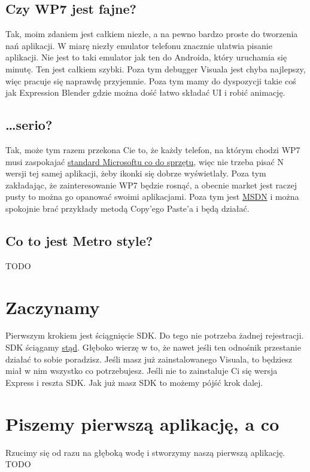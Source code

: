 \documentclass[12pt, a4paper]{article}
\begin{document}
\subsection{Czy WP7 jest fajne?}
Tak, moim zdaniem jest całkiem niezłe, a na pewno bardzo proste do tworzenia nań
aplikacji. W miarę niezły emulator telefonu znacznie ułatwia pisanie aplikacji.
Nie jest to taki emulator jak ten do Androida, który uruchamia się minutę. Ten
jest całkiem szybki. Poza tym debugger Visuala jest chyba najlepszy, więc
pracuje się naprawdę przyjemnie. Poza tym mamy do dyspozycji takie coś jak
Expression Blender gdzie można dość łatwo składać UI i robić animację.
\subsection{\ldots serio?}
Tak, może tym razem przekona Cie to, że każdy telefon, na którym chodzi WP7 musi
zaspokajać
\href{http://msdn.microsoft.com/en-us/library/ff637514%28v=vs.92%29.aspx}{standard
 Microsoftu co do sprzętu}, więc nie trzeba pisać N wersji tej samej aplikacji,
 żeby ikonki się dobrze wyświetlały. Poza tym zakładając, że
zainteresowanie WP7 będzie rosnąć, a obecnie market jest raczej pusty to można
go opanować swoimi aplikacjami. Poza tym jest
\href{http://msdn.microsoft.com/en-us/library/ff402535%28v=vs.92%29}{MSDN} i
 można spokojnie brać przykłady metodą Copy'ego Paste'a i będą działać.

\subsection{Co to jest Metro style?}
TODO

\section{Zaczynamy}
Pierwszym krokiem jest ściągnięcie SDK. Do tego nie potrzeba żadnej rejestracji.
SDK ściągamy
\href{http://www.microsoft.com/en-us/download/details.aspx?id=27570}{stąd}.
Głęboko wierzę w to, że nawet jeśli ten odnośnik przestanie działać to sobie
poradzisz. Jeśli masz już zainstalowanego Visuala, to będziesz miał w nim
wszystko co potrzebujesz. Jeśli nie to zainstaluje Ci się wersja Express i
reszta SDK.
Jak już masz SDK to możemy pójść krok dalej.

\section{Piszemy pierwszą aplikację, a co}
Rzucimy się od razu na głęboką wodę i stworzymy naszą pierwszą aplikację.
TODO
\end{document}
